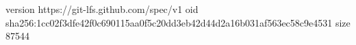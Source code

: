version https://git-lfs.github.com/spec/v1
oid sha256:1cc02f3dfe42f0c690115aa0f5c20dd3eb42d44d2a16b031af563ec58c9e4531
size 87544
